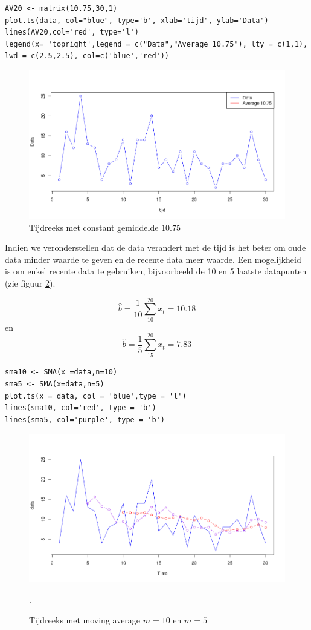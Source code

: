 \begin{lstlisting}
AV20 <- matrix(10.75,30,1)
plot.ts(data, col="blue", type='b', xlab='tijd', ylab='Data')
lines(AV20,col='red', type='l')
legend(x= 'topright',legend = c("Data","Average 10.75"), lty = c(1,1), lwd = c(2.5,2.5), col=c('blue','red'))
\end{lstlisting}

\begin{figure}
	\centering
		\includegraphics[width=1.00\textwidth]{images/tijdsreeksen/tijdsreeks20.png}
	\caption{Tijdreeks met constant gemiddelde $10.75$}
	\label{fig:tijdreeks21}
\end{figure}


Indien we veronderstellen dat de data verandert met de tijd is het beter om oude data minder waarde te geven en de recente data meer waarde. Een mogelijkheid is om enkel recente data te gebruiken, bijvoorbeeld de 10 en 5 laatste datapunten (zie figuur \ref{fig:tijdreeks31}).

\[ \widehat{b} = \frac{1}{10} \sum_{10}^{20} x_{t} = 10.18 \] en
\[ \widehat{b} = \frac{1}{5} \sum_{15}^{20} x_{t} = 7.83 \]

\begin{lstlisting}
sma10 <- SMA(x =data,n=10)
sma5 <- SMA(x=data,n=5)
plot.ts(x = data, col = 'blue',type = 'l')
lines(sma10, col='red', type = 'b')
lines(sma5, col='purple', type = 'b')
\end{lstlisting}

\begin{figure}
	\centering
		\includegraphics[width=1.00\textwidth]{images/tijdsreeksen/tijdsreekssma.png}
		\caption{Tijdreeks met moving average $m = 10$ en $m=5$}. 
	\label{fig:tijdreeks31}
\end{figure}




